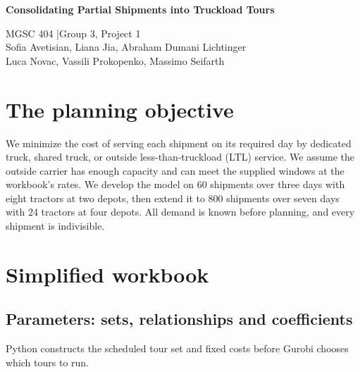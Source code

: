 \documentclass[11pt,letterpaper]{article}
\begin{document}
\begin{center}
{\Large\bfseries Consolidating Partial Shipments into Truckload Tours\par}
\vspace{5pt}
MGSC 404 \enspace|\enspace Group 3, Project 1\\[3pt]
{\small Sofia Avetisian, Liana Jia, Abraham Dumani Lichtinger\\
Luca Novac, Vassili Prokopenko, Massimo Seifarth}
\end{center}

\section*{The planning objective}

We minimize the cost of serving each shipment on its required day by
dedicated truck, shared truck, or outside less-than-truckload (LTL)
service. We assume the outside carrier has enough capacity and can
meet the supplied windows at the workbook's rates. We develop the
model on 60 shipments over three days with eight
tractors at two depots, then extend it to 800 shipments over seven days
with 24 tractors at four depots. All demand is known before planning,
and every shipment is indivisible.

\section{Simplified workbook}

\subsection*{Parameters: sets, relationships and coefficients}

Python constructs the scheduled tour set and fixed costs before
Gurobi chooses which tours to run.
\end{document}
